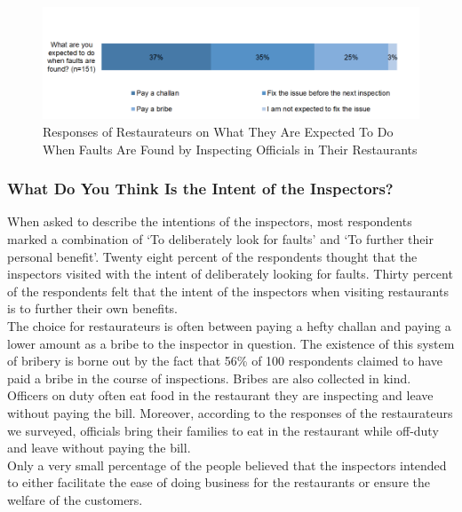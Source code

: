 \documentclass[a4paper, 12pt, twoside]{article}
\begin{document}
		\begin{figure}[H]
                    	\centering
                    	\includegraphics[width = 6.5in]{Figure6.png}
                    	\captionsetup{justification=centering}\caption[Optional Caption]{Responses of Restaurateurs on What They Are Expected To Do When Faults Are Found by Inspecting Officials in Their Restaurants}
		\end{figure}

		\subsubsection {What Do You Think Is the Intent of the Inspectors?}
			When asked to describe the intentions of the inspectors, most respondents marked a combination of ‘To deliberately look for faults’ and ‘To further their personal benefit’. Twenty eight percent of the respondents thought that the inspectors visited with the intent of 
deliberately looking for faults. Thirty percent of the respondents felt that the intent of the inspectors when visiting restaurants is to further their own benefits.\\
		
		The choice for restaurateurs is often between paying a hefty challan and paying a lower amount as a bribe to the inspector in question. The existence of this system of bribery is borne out by the fact that 56\% of 100 respondents claimed to have paid a 
bribe in the course of inspections. Bribes are also collected in kind. Officers on duty often eat food in the restaurant they are inspecting and leave without paying the bill. Moreover, according to the responses of the restaurateurs we surveyed, officials bring their 
families to eat in the restaurant while off-duty and leave without paying the bill.\\
		
		Only a very small percentage of the people believed that the inspectors intended to either facilitate the ease of doing business for the restaurants or ensure the welfare of the customers.
\end{document}
